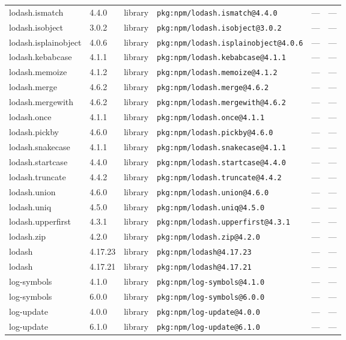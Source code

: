 \documentclass[11pt]{article}
\begin{document}
\begin{longtable}{|l|l|l|p{2.2cm}|l|p{4cm}|}
lodash.ismatch & 4.4.0 & library & \texttt{pkg:npm/lodash.ismatch@4.4.0} & — & — \\
lodash.isobject & 3.0.2 & library & \texttt{pkg:npm/lodash.isobject@3.0.2} & — & — \\
lodash.isplainobject & 4.0.6 & library & \texttt{pkg:npm/lodash.isplainobject@4.0.6} & — & — \\
lodash.kebabcase & 4.1.1 & library & \texttt{pkg:npm/lodash.kebabcase@4.1.1} & — & — \\
lodash.memoize & 4.1.2 & library & \texttt{pkg:npm/lodash.memoize@4.1.2} & — & — \\
lodash.merge & 4.6.2 & library & \texttt{pkg:npm/lodash.merge@4.6.2} & — & — \\
lodash.mergewith & 4.6.2 & library & \texttt{pkg:npm/lodash.mergewith@4.6.2} & — & — \\
lodash.once & 4.1.1 & library & \texttt{pkg:npm/lodash.once@4.1.1} & — & — \\
lodash.pickby & 4.6.0 & library & \texttt{pkg:npm/lodash.pickby@4.6.0} & — & — \\
lodash.snakecase & 4.1.1 & library & \texttt{pkg:npm/lodash.snakecase@4.1.1} & — & — \\
lodash.startcase & 4.4.0 & library & \texttt{pkg:npm/lodash.startcase@4.4.0} & — & — \\
lodash.truncate & 4.4.2 & library & \texttt{pkg:npm/lodash.truncate@4.4.2} & — & — \\
lodash.union & 4.6.0 & library & \texttt{pkg:npm/lodash.union@4.6.0} & — & — \\
lodash.uniq & 4.5.0 & library & \texttt{pkg:npm/lodash.uniq@4.5.0} & — & — \\
lodash.upperfirst & 4.3.1 & library & \texttt{pkg:npm/lodash.upperfirst@4.3.1} & — & — \\
lodash.zip & 4.2.0 & library & \texttt{pkg:npm/lodash.zip@4.2.0} & — & — \\
lodash & 4.17.23 & library & \texttt{pkg:npm/lodash@4.17.23} & — & — \\
lodash & 4.17.21 & library & \texttt{pkg:npm/lodash@4.17.21} & — & — \\
log-symbols & 4.1.0 & library & \texttt{pkg:npm/log-symbols@4.1.0} & — & — \\
log-symbols & 6.0.0 & library & \texttt{pkg:npm/log-symbols@6.0.0} & — & — \\
log-update & 4.0.0 & library & \texttt{pkg:npm/log-update@4.0.0} & — & — \\
log-update & 6.1.0 & library & \texttt{pkg:npm/log-update@6.1.0} & — & — \\

\end{longtable}
\end{document}
